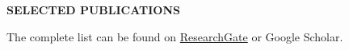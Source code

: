 
\vspace{\spaceBeforeSection}
\textbf{SELECTED PUBLICATIONS} \hrulefill
\vspace{\spaceAfterSection}

\nocite{*} %

\printbibliography[heading=none, keyword={cv_selected}] %

The complete list can be found on \href{https://www.researchgate.net/profile/Winnie-The-Pooh/research}{ResearchGate} or Google Scholar. 
